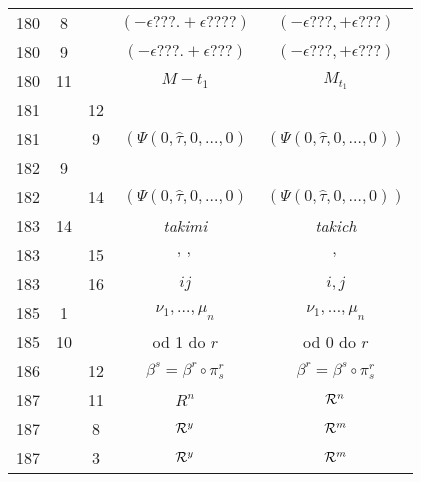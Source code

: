 \documentclass[a4paper,11pt]{article}
\begin{document}
\begin{center}
\begin{tabular}{|c|c|c|c|c|}
    180 &  8 & & $( -\epsilon???. +\epsilon???? )$ & $( -\epsilon???, +\epsilon??? )$ \\
    180 &  9 & & $( -\epsilon???. +\epsilon??? )$ & $( -\epsilon???, +\epsilon??? )$ \\
    180 & 11 & & $M - t_{ 1 }$ & $M_{ t_{ 1 } }$ \\
    181 & & 12 & & \\
    181 & &  9 & $\left( \Psi( 0, \hat{ \tau }, 0, \ldots, 0) \right.$
           & $\left( \Psi( 0, \hat{ \tau }, 0, \ldots, 0) \right)$ \\
    182 &  9 & & & \\
    182 & & 14 & $\left( \Psi( 0, \hat{ \tau }, 0, \ldots, 0) \right.$
           & $\left( \Psi( 0, \hat{ \tau }, 0, \ldots, 0) \right)$ \\
    183 & 14 & & \textit{takimi} & \textit{takich} \\
    183 & & 15 & $,\, ,$ & $,$ \\
    183 & & 16 & $ij$ & $i, j$ \\
    185 &  1 & & $\nu_{ 1 },\!\ldots,\! \mu_{ n }$
           & $\nu_{ 1 }, \ldots, \mu_{ n }$ \\
    185 & 10 & & od 1 do $r$ & od 0 do $r$ \\
    186 & & 12 & $\beta^{ s } = \beta^{ r } \circ \pi^{ r }_{ s }$
           & $\beta^{ r } = \beta^{ s } \circ \pi^{ r }_{ s }$ \\
    187 & & 11 & $R^{ n }$ & $\mathcal{R}^{ n }$ \\
    187 & &  8 & $\mathcal{R}^{ y }$ & $\mathcal{R}^{ m }$ \\
    187 & &  3 & $\mathcal{R}^{ y }$ & $\mathcal{R}^{ m }$ \\
    \hline
  \end{tabular}






\end{center}
\end{document}
